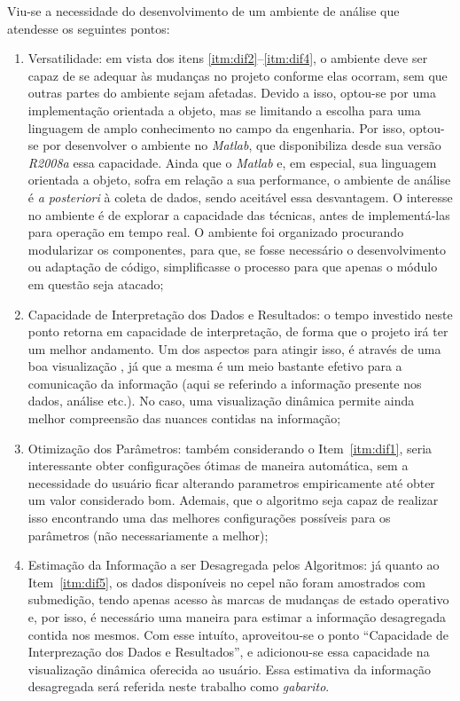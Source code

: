 Viu-se a necessidade do
desenvolvimento de um ambiente de análise que atendesse os seguintes
pontos:

\begin{enumerate}
\item Versatilidade: em vista dos itens
\ref{itm:dif2}--\ref{itm:dif4}, o ambiente deve ser capaz de se
adequar às mudanças no projeto conforme elas ocorram, sem que outras
partes do ambiente sejam afetadas. Devido a isso, optou-se por uma
implementação orientada a objeto, mas se limitando a escolha para uma
linguagem de amplo conhecimento no campo da engenharia. Por isso,
optou-se por desenvolver o ambiente no \emph{Matlab}, que
disponibiliza desde sua versão \emph{R2008a} essa capacidade.
Ainda que o \emph{Matlab} e, em especial, sua linguagem orientada a
objeto, sofra em relação a sua performance, o ambiente de análise é
\emph{a posteriori} à coleta de dados, sendo aceitável essa
desvantagem. O interesse no ambiente é de explorar a capacidade das
técnicas, antes de implementá-las para operação em tempo real. O ambiente
foi organizado procurando modularizar os componentes, para que, se
fosse necessário o desenvolvimento ou adaptação de código,
simplificasse o processo para que apenas o módulo em questão seja 
atacado;

\item Capacidade de Interpretação dos Dados e Resultados: o tempo
investido neste ponto retorna em capacidade de interpretação, de forma
que o projeto irá ter um melhor andamento. Um dos aspectos para
atingir isso, é através de uma boa visualização \cite{it_depends}, já
que a mesma é um meio bastante efetivo para a comunicação da
informação (aqui se referindo a informação presente nos dados,
análise etc.). No caso, uma visualização dinâmica permite ainda melhor
compreensão das nuances contidas na informação;

\item Otimização dos Parâmetros: também considerando o
Item~\ref{itm:dif1}, seria interessante obter configurações ótimas de
maneira automática, sem a necessidade do usuário ficar alterando
parametros empiricamente até obter um valor considerado bom.
Ademais, que o algoritmo seja capaz de realizar isso encontrando uma
das melhores configurações possíveis para os parâmetros (não
necessariamente a melhor);

\item Estimação da Informação a ser Desagregada pelos Algoritmos: já
quanto ao Item~\ref{itm:dif5}, os dados disponíveis no \acs{cepel} não
foram amostrados com submedição, tendo apenas acesso às marcas de
mudanças de estado operativo e, por isso, é necessário uma maneira para
estimar a informação desagregada contida nos mesmos. Com esse intuíto,
aproveitou-se o ponto ``Capacidade de Interprezação dos Dados e
Resultados'', e adicionou-se essa capacidade na
visualização dinâmica oferecida ao usuário. Essa estimativa da
informação desagregada será referida neste trabalho como
\emph{gabarito}.

\end{enumerate}


